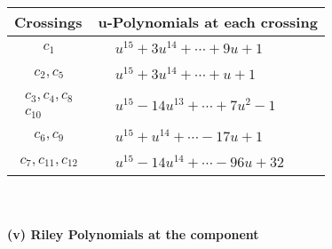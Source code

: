 \documentclass[1p]{elsarticle_modified}
\theoremstyle{definition}
\begin{document}
\begin{tabular}{m{50pt}|m{274pt}}
Crossings & \hspace{64pt}u-Polynomials at each crossing \\
\hline $$\begin{aligned}c_{1}\end{aligned}$$&$\begin{aligned}
&u^{15}+3 u^{14}+\cdots+9 u+1
\end{aligned}$\\
\hline $$\begin{aligned}c_{2},c_{5}\end{aligned}$$&$\begin{aligned}
&u^{15}+3 u^{14}+\cdots+u+1
\end{aligned}$\\
\hline $$\begin{aligned}c_{3},c_{4},c_{8}\\c_{10}\end{aligned}$$&$\begin{aligned}
&u^{15}-14 u^{13}+\cdots+7 u^2-1
\end{aligned}$\\
\hline $$\begin{aligned}c_{6},c_{9}\end{aligned}$$&$\begin{aligned}
&u^{15}+u^{14}+\cdots-17 u+1
\end{aligned}$\\
\hline $$\begin{aligned}c_{7},c_{11},c_{12}\end{aligned}$$&$\begin{aligned}
&u^{15}-14 u^{14}+\cdots-96 u+32
\end{aligned}$\\
\hline
\end{tabular}\\~\\
\newpage\renewcommand{\arraystretch}{1}
\flushleft \textbf{(v) Riley Polynomials at the component}\newline \\
\end{document}
